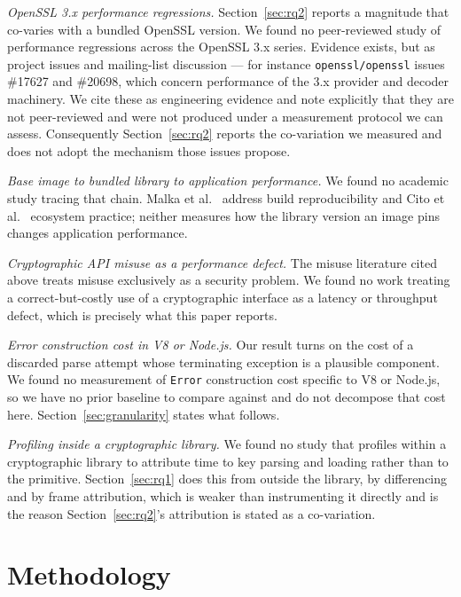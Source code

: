 \documentclass[pdflatex,sn-basic,twocolumn]{sn-jnl}%
\begin{document}
\emph{OpenSSL 3.x performance regressions.} Section~\ref{sec:rq2} reports a
magnitude that co-varies with a bundled OpenSSL version. We found no
peer-reviewed study of performance regressions across the OpenSSL 3.x series.
Evidence exists, but as project issues and mailing-list discussion --- for
instance \texttt{openssl/openssl} issues \#17627 and \#20698, which concern
performance of the 3.x provider and decoder machinery. We cite these as
engineering evidence and note explicitly that they are not peer-reviewed and
were not produced under a measurement protocol we can assess. Consequently
Section~\ref{sec:rq2} reports the co-variation we measured and does not adopt
the mechanism those issues propose.

\emph{Base image to bundled library to application performance.} We found no
academic study tracing that chain. Malka et al.~\cite{malka2026docker} address
build reproducibility and Cito et al.~\cite{cito2017empirical} ecosystem
practice; neither measures how the library version an image pins changes
application performance.

\emph{Cryptographic API misuse as a performance defect.} The misuse literature
cited above treats misuse exclusively as a security problem. We found no work
treating a correct-but-costly use of a cryptographic interface as a latency or
throughput defect, which is precisely what this paper reports.

\emph{Error construction cost in V8 or Node.js.} Our result turns on the cost of
a discarded parse attempt whose terminating exception is a plausible component.
We found no measurement of \texttt{Error} construction cost specific to V8 or
Node.js, so we have no prior baseline to compare against and do not decompose
that cost here. Section~\ref{sec:granularity} states what follows.

\emph{Profiling inside a cryptographic library.} We found no study that profiles
within a cryptographic library to attribute time to key parsing and loading
rather than to the primitive. Section~\ref{sec:rq1} does this from outside the
library, by differencing and by frame attribution, which is weaker than
instrumenting it directly and is the reason Section~\ref{sec:rq2}'s attribution
is stated as a co-variation.

\section{Methodology}\label{sec:method}
\end{document}

